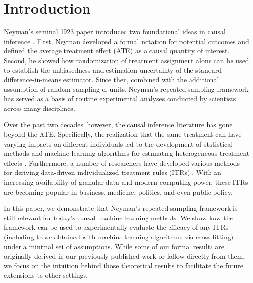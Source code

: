 \documentclass[USenglish,onecolumn]{article}
\begin{document}
\maketitle
\section{Introduction}

Neyman's seminal 1923 paper introduced two foundational ideas in
causal inference \cite{neyman1923application}.  First, Neyman
developed a formal notation for potential outcomes and defined the
average treatment effect (ATE) as a causal quantity of interest.
Second, he showed how randomization of treatment assignment alone can
be used to establish the unbiasedness and estimation uncertainty of
the standard difference-in-means estimator.  Since then, combined with
the additional assumption of random sampling of units, Neyman's
repeated sampling framework has served as a basis of routine
experimental analyses conducted by scientists across many disciplines.

Over the past two decades, however, the causal inference literature
has gone beyond the ATE.  Specifically, the realization that the same
treatment can have varying impacts on different individuals led to the
development of statistical methods and machine learning algorithms for
estimating heterogeneous treatment effects
\citep[e.g.,][]{imai:ratk:13,athe:imbe:16,wage:athe:18,hahn:murr:carv:20}.
Furthermore, a number of researchers have developed various methods
for deriving data-driven individualized treatment rules (ITRs)
\citep[e.g.][]{dudi:etal:11, zhan:etal:12a,chak:labe:zhao:14,
  jian:li:16, kall:18, qi2020multi, mo2022efficient, benm:etal:21}.
With an increasing availability of granular data and modern computing
power, these ITRs are becoming popular in business, medicine,
politics, and even public policy.

In this paper, we demonstrate that Neyman's repeated sampling
framework is still relevant for today's causal machine learning
methods. We show how the framework can be used to experimentally
evaluate the efficacy of any ITRs (including those obtained with
machine learning algorithms via cross-fitting) under a minimal set of
assumptions.  While some of our formal results are originally derived
in our previously published work \citep{imai2021experimental} or
follow directly from them, we focus on the intuition behind those
theoretical results to facilitate the future extensions to other
settings.
\end{document}
